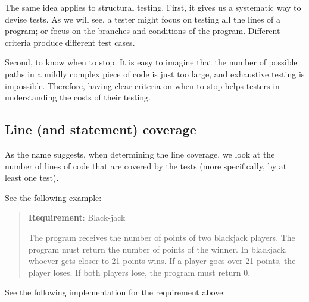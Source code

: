 The same idea applies to structural testing. First, it gives us a
systematic way to devise tests. As we will see, a tester might focus on
testing all the lines of a program; or focus on the branches and
conditions of the program. Different criteria produce different test
cases.

Second, to know when to stop. It is easy to imagine that the number of
possible paths in a mildly complex piece of code is just too large, and
exhaustive testing is impossible. Therefore, having clear criteria on
when to stop helps testers in understanding the costs of their testing.

\hypertarget{line-and-statement-coverage}{%
\subsection{Line (and statement)
coverage}\label{line-and-statement-coverage}}

As the name suggests, when determining the line coverage, we look at the
number of lines of code that are covered by the tests (more
specifically, by at least one test).

See the following example:

\begin{quote}
\textbf{Requirement}: Black-jack

The program receives the number of points of two blackjack players. The
program must return the number of points of the winner. In blackjack,
whoever gets closer to 21 points wins. If a player goes over 21 points,
the player loses. If both players lose, the program must return 0.
\end{quote}

See the following implementation for the requirement above:

\begin{Shaded}
\begin{Highlighting}[]
 
    \NormalTok{(}
  
  
  \NormalTok{)}
\NormalTok{;}
  \NormalTok{)}
\NormalTok{;}
  
    
  
   
\NormalTok{  \}}
\NormalTok{\}}
\end{Highlighting}
\end{Shaded}

